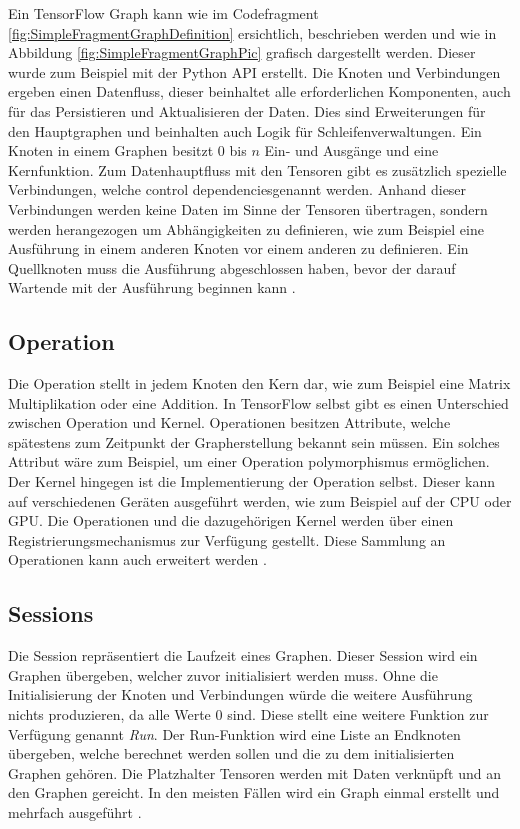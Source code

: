 Ein TensorFlow Graph kann wie im Codefragment \ref{fig:SimpleFragmentGraphDefinition} ersichtlich, beschrieben werden und wie in Abbildung \ref{fig:SimpleFragmentGraphPic} grafisch dargestellt werden.
Dieser wurde zum Beispiel mit der Python API erstellt.
Die Knoten und Verbindungen ergeben einen Datenfluss, dieser beinhaltet alle erforderlichen Komponenten, auch für das Persistieren und Aktualisieren der Daten.
Dies sind Erweiterungen für den Hauptgraphen und beinhalten auch Logik für Schleifenverwaltungen.
Ein Knoten in einem Graphen besitzt $0$ bis $n$ Ein- und Ausgänge und eine Kernfunktion. 
Zum Datenhauptfluss mit den Tensoren gibt es zusätzlich spezielle Verbindungen, welche \glqq control dependencies\grqq genannt werden. 
Anhand dieser Verbindungen werden keine Daten im Sinne der Tensoren übertragen, sondern werden herangezogen um Abhängigkeiten zu definieren, wie zum Beispiel eine Ausführung in einem anderen Knoten vor einem anderen zu definieren.
Ein Quellknoten muss die Ausführung abgeschlossen haben, bevor der darauf Wartende mit der Ausführung beginnen kann \cite{wp2015tensorflow}. \\ 

\subsection{Operation}

Die Operation stellt in jedem Knoten den Kern dar, wie zum Beispiel eine Matrix Multiplikation oder eine Addition.
In TensorFlow selbst gibt es einen Unterschied zwischen Operation und Kernel.
Operationen besitzen Attribute, welche spätestens zum Zeitpunkt der Grapherstellung bekannt sein müssen. 
Ein solches Attribut wäre zum Beispiel, um einer Operation polymorphismus ermöglichen.  
Der Kernel hingegen ist die Implementierung der Operation selbst. 
Dieser kann auf verschiedenen Geräten ausgeführt werden, wie zum Beispiel auf der CPU oder GPU.
Die Operationen und die dazugehörigen Kernel werden über einen Registrierungsmechanismus zur Verfügung gestellt. 
Diese Sammlung an Operationen kann auch erweitert werden \cite{wp2015tensorflow}. 

\subsection{Sessions}

Die Session repräsentiert die Laufzeit eines Graphen. 
Dieser Session wird ein Graphen übergeben, welcher zuvor initialisiert werden muss. 
Ohne die Initialisierung der Knoten und Verbindungen würde die weitere Ausführung nichts produzieren, da alle Werte $0$ sind. 
Diese stellt eine weitere Funktion zur Verfügung genannt \textit{Run}. 
Der Run-Funktion wird eine Liste an Endknoten übergeben, welche berechnet werden sollen und die zu dem initialisierten Graphen gehören. 
Die Platzhalter Tensoren werden mit Daten verknüpft und an den Graphen gereicht. 
In den meisten Fällen wird ein Graph einmal erstellt und mehrfach ausgeführt \cite{wp2015tensorflow}. 

